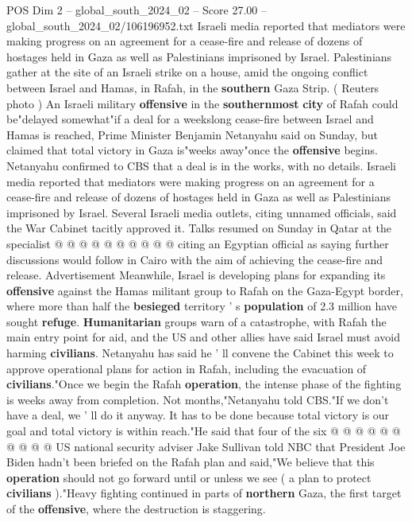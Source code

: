 \begin{textsample}{POS Dim 2 – global\_south\_2024\_02 – Score 27.00 – global\_south\_2024\_02/106196952.txt}  \label{ex:f2_pos_034}
Israeli media reported that mediators were making progress on an agreement for a cease-fire and release of dozens of hostages held in Gaza as well as Palestinians imprisoned by Israel.
Palestinians gather at the site of an Israeli strike on a house, amid the ongoing conflict between Israel and Hamas, in Rafah, in the \textbf{southern} Gaza Strip. ( Reuters photo ) An Israeli military \textbf{offensive} in the \textbf{southernmost} \textbf{city} of Rafah could be"delayed somewhat"if a deal for a weekslong cease-fire between Israel and Hamas is reached, Prime Minister Benjamin Netanyahu said on Sunday, but claimed that total victory in Gaza is"weeks away"once the \textbf{offensive} begins.
Netanyahu confirmed to CBS that a deal is in the works, with no details.
Israeli media reported that mediators were making progress on an agreement for a cease-fire and release of dozens of hostages held in Gaza as well as Palestinians imprisoned by Israel.
Several Israeli media outlets, citing unnamed officials, said the War Cabinet tacitly approved it.
Talks resumed on Sunday in Qatar at the specialist @ @ @ @ @ @ @ @ @ @ citing an Egyptian official as saying further discussions would follow in Cairo with the aim of achieving the cease-fire and release.
Advertisement Meanwhile, Israel is developing plans for expanding its \textbf{offensive} against the Hamas militant group to Rafah on the Gaza-Egypt border, where more than half the \textbf{besieged} territory ' s \textbf{population} of 2.3 million have sought \textbf{refuge}. \textbf{Humanitarian} groups warn of a catastrophe, with Rafah the main entry point for aid, and the US and other allies have said Israel must avoid harming \textbf{civilians}.
Netanyahu has said he ' ll convene the Cabinet this week to approve operational plans for action in Rafah, including the evacuation of \textbf{civilians}."Once we begin the Rafah \textbf{operation}, the intense phase of the fighting is weeks away from completion.
Not months,"Netanyahu told CBS."If we don't have a deal, we ' ll do it anyway.
It has to be done because total victory is our goal and total victory is within reach."He said that four of the six @ @ @ @ @ @ @ @ @ @ US national security adviser Jake Sullivan told NBC that President Joe Biden hadn't been briefed on the Rafah plan and said,"We believe that this \textbf{operation} should not go forward until or unless we see ( a plan to protect \textbf{civilians} )."Heavy fighting continued in parts of \textbf{northern} Gaza, the first target of the \textbf{offensive}, where the destruction is staggering.

\end{textsample}
